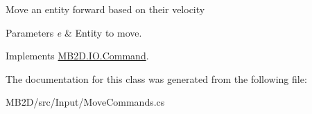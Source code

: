 Move an entity forward based on their velocity 


\begin{DoxyParams}{Parameters}
{\em e} & Entity to move.\\
\hline
\end{DoxyParams}


Implements \hyperlink{class_m_b2_d_1_1_i_o_1_1_command_ae927e36c0e285848325cc68eddb5fd72}{M\+B2\+D.\+I\+O.\+Command}.



The documentation for this class was generated from the following file\+:\begin{DoxyCompactItemize}
\item 
M\+B2\+D/src/\+Input/Move\+Commands.\+cs\end{DoxyCompactItemize}
